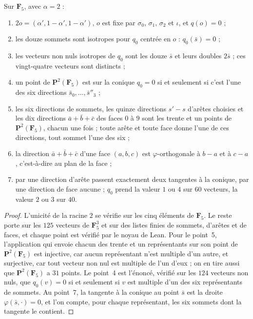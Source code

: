 \begin{encadre}
\begin{theoreme}
Sur $\mathbf F_5$, avec $\alpha = 2$ :
\begin{enumerate}
\item $2o = (\alpha', 1 - \alpha', 1 - \alpha')$, $o$ est fixe par $\sigma_0$, $\sigma_1$, $\sigma_2$ et $\iota$, et $q(o) = 0$ ;
\item les douze sommets sont isotropes pour $q_0$ centrée en $o$ : $q_0(\bar s) = 0$ ;
\item les vecteurs non nuls isotropes de $q_0$ sont les douze $\bar s$ et leurs doubles $2\bar s$ ; ces vingt-quatre vecteurs sont distincts ;
\item un point de $\mathbf P^2(\mathbf F_5)$ est sur la conique $q_0 = 0$ si et seulement si c'est l'une des six directions $\bar s_0, \dots, \bar s''_3$ ;
\item les six directions de sommets, les quinze directions $s' - s$ d'arêtes choisies et les dix directions $\bar a + \bar b + \bar c$ des faces $0$ à $9$ sont les trente et un points de $\mathbf P^2(\mathbf F_5)$, chacun une fois ; toute arête et toute face donne l'une de ces directions, tout sommet l'une des six ;
\item la direction $\bar a + \bar b + \bar c$ d'une face $(a, b, c)$ est $\varphi$-orthogonale à $b - a$ et à $c - a$, c'est-à-dire au plan de la face ;
\item par une direction d'arête passent exactement deux tangentes à la conique, par une direction de face aucune ; $q_0$ prend la valeur $1$ ou $4$ sur $60$ vecteurs, la valeur $2$ ou $3$ sur $40$.
\end{enumerate}
\end{theoreme}
\end{encadre}

\begin{proof}
L'unicité de la racine $2$ se vérifie sur les cinq éléments de $\mathbf F_5$. Le reste porte sur les $125$ vecteurs de $\mathbf F_5^3$ et sur des listes finies de sommets, d'arêtes et de faces, et chaque point est vérifié par le noyau de Lean. Pour le point~5, l'application qui envoie chacun des trente et un représentants sur son point de $\mathbf P^2(\mathbf F_5)$ est injective, car aucun représentant n'est multiple d'un autre, et surjective, car tout vecteur non nul est multiple de l'un d'eux ; on en tire aussi que $\mathbf P^2(\mathbf F_5)$ a $31$ points. Le point~4 est l'énoncé, vérifié sur les $124$ vecteurs non nuls, que $q_0(v) = 0$ si et seulement si $v$ est multiple d'un des six représentants de sommets. Au point~7, la tangente à la conique au point $\bar s$ est la droite $\varphi(\bar s, \cdot) = 0$, et l'on compte, pour chaque représentant, les six sommets dont la tangente le contient.
\end{proof}

